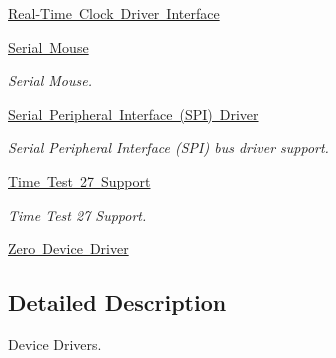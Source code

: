 \begin{DoxyCompactItemize}
\item 
\mbox{\hyperlink{group__rtems__rtc}{Real-\/\+Time Clock Driver Interface}}
\item 
\mbox{\hyperlink{group__libmisc__mouse}{Serial Mouse}}
\begin{DoxyCompactList}\small\item\em Serial Mouse. \end{DoxyCompactList}\item 
\mbox{\hyperlink{group__SPI}{Serial Peripheral Interface (\+S\+P\+I) Driver}}
\begin{DoxyCompactList}\small\item\em Serial Peripheral Interface (S\+PI) bus driver support. \end{DoxyCompactList}\item 
\mbox{\hyperlink{group__RTEMSTimeTest27Support}{Time Test 27 Support}}
\begin{DoxyCompactList}\small\item\em Time Test 27 Support. \end{DoxyCompactList}\item 
\mbox{\hyperlink{group__libmisc__devzero}{Zero Device Driver}}
\end{DoxyCompactItemize}


\subsection{Detailed Description}
Device Drivers. 

